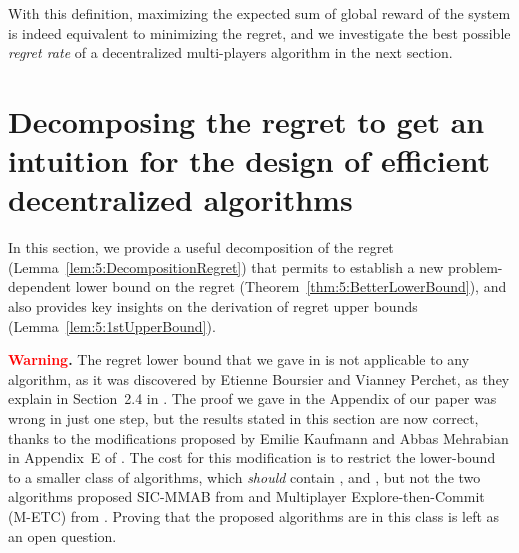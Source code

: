 With this definition, maximizing the expected sum of global reward of the system is indeed equivalent to minimizing the regret, and we investigate the best possible \emph{regret rate} of a decentralized multi-players algorithm in the next section.



\section[Decomposing the regret to get an intuition about efficient decentralized algorithms]{Decomposing the regret to get an intuition for the design of efficient decentralized algorithms}
\label{sec:5:lowerbound}

In this section, we provide a useful decomposition of the regret (Lemma~\ref{lem:5:DecompositionRegret}) that permits to establish a new problem-dependent lower bound on the regret (Theorem~\ref{thm:5:BetterLowerBound}), and also provides key insights on the derivation of regret upper bounds (Lemma~\ref{lem:5:1stUpperBound}).

\begin{leftbar}[warningbar]  %
  \textbf{\textcolor{red}{Warning}.}
  The regret lower bound that we gave in \cite{Besson2018ALT} is not applicable to any algorithm,
  as it was discovered by Etienne Boursier and Vianney Perchet, as they explain in Section~2.4 in \cite{BoursierPerchet18}.
  The proof we gave in the Appendix of our paper \cite{Besson2018ALT} was wrong in just one step,
  but the results stated in this section are now correct,
  thanks to the modifications proposed by Emilie Kaufmann and Abbas Mehrabian in Appendix~E of \cite{KaufmannAbbas19}.
  The cost for this modification is to restrict the lower-bound to a smaller class of algorithms, which \emph{should} contain \RhoRand, \RandTopM{} and \MCTopM, but not the two algorithms proposed SIC-MMAB from \cite{BoursierPerchet18} and Multiplayer Explore-then-Commit (M-ETC) from \cite{KaufmannAbbas19}.
  Proving that the proposed algorithms are in this class is left as an open question.
\end{leftbar}  %


